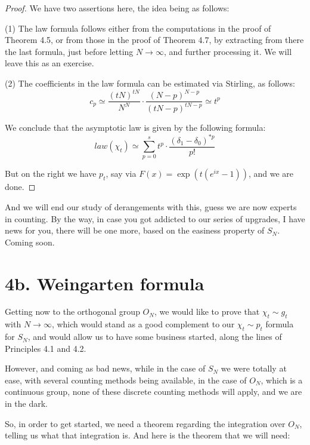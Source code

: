 \documentclass[12pt]{amsbook}
\begin{document}
\begin{proof}
We have two assertions here, the idea being as follows:

\medskip

(1) The law formula follows either from the computations in the proof of Theorem 4.5, or from those in the proof of Theorem 4.7, by extracting from there the last formula, just before letting $N\to\infty$, and further processing it. We will leave this as an exercise.

\medskip

(2) The coefficients in the law formula can be estimated via Stirling, as follows:
$$c_p
\simeq\frac{(tN)^{tN}}{N^N}\cdot\frac{(N-p)^{N-p}}{(tN-p)^{tN-p}}
\simeq t^p$$

We conclude that the asymptotic law is given by the following formula:
$$law(\chi_t)\simeq \sum_{p=0}^st^p\cdot\frac{\left(\delta_1-\delta_0\right)^{*p}}{p!}$$

But on the right we have $p_t$, say via $F(x)=\exp(t(e^{ix}-1))$, and we are done.
\end{proof}

And we will end our study of derangements with this, guess we are now experts in counting. By the way, in case you got addicted to our series of upgrades, I have news for you, there will be one more, based on the easiness property of $S_N$. Coming soon. 

\section*{4b. Weingarten formula}

Getting now to the orthogonal group $O_N$, we would like to prove that $\chi_t\sim g_t$ with $N\to\infty$, which would stand as a good complement to our $\chi_t\sim p_t$ formula for $S_N$, and would allow us to have some business started, along the lines of Principles 4.1 and 4.2.

\bigskip

However, and coming as bad news, while in the case of $S_N$ we were totally at ease, with several counting methods being available, in the case of $O_N$, which is a continuous group, none of these discrete counting methods will apply, and we are in the dark.

\bigskip

So, in order to get started, we need a theorem regarding the integration over $O_N$, telling us what that integration is. And here is the theorem that we will need:
\end{document}
